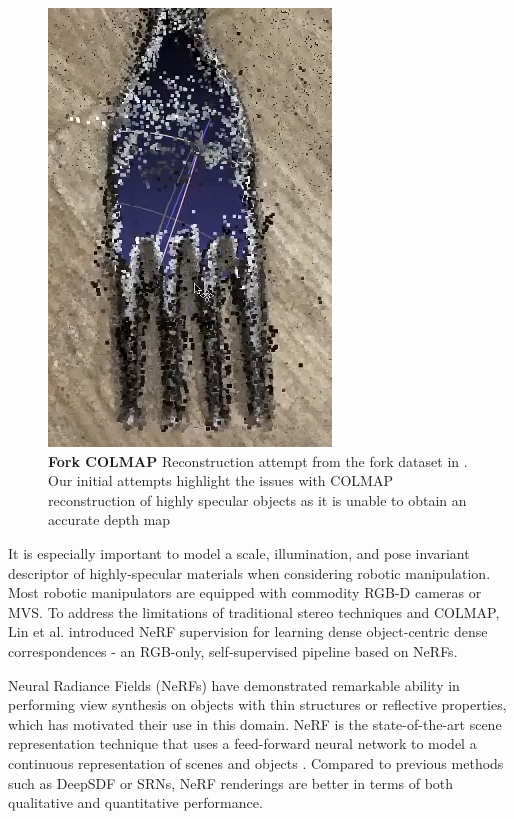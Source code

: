 \documentclass[conference]{IEEEtran}
\begin{document}
\begin{figure} [h]
\centering
  \includegraphics[scale = 0.4]{figures/introduction/fork.png}  
  \caption{\label{fig:fork_colmap} \textbf{Fork COLMAP} Reconstruction attempt from the fork dataset in \cite{yen2022nerfsupervision}. Our initial attempts highlight the issues with COLMAP reconstruction of highly specular objects as it is unable to obtain an accurate depth map}
\end{figure}

It is especially important to model a scale, illumination, and pose invariant descriptor of highly-specular materials when considering robotic manipulation. Most robotic manipulators are equipped with commodity RGB-D cameras or MVS. To address the limitations of traditional stereo techniques and COLMAP, Lin et al. \cite{yen2022nerfsupervision} introduced NeRF supervision for learning dense object-centric dense correspondences - an RGB-only, self-supervised pipeline based on NeRFs.\vspace{2mm}

Neural Radiance Fields (NeRFs) have demonstrated remarkable ability in performing view synthesis on objects with thin structures or reflective properties, which has motivated their use in this domain. NeRF is the state-of-the-art scene representation technique that uses a feed-forward neural network to model a continuous representation of scenes and objects \cite{understanding-nerfs}. Compared to previous methods such as DeepSDF or SRNs, NeRF renderings are better in terms of both qualitative and quantitative performance.
\end{document}
